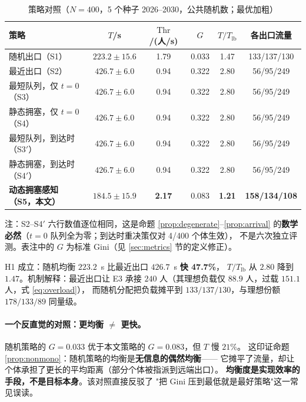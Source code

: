 \begin{table}[H]
  \centering
  \caption{策略对照（$N=400$，5 个种子 2026--2030，公共随机数；最优加粗）}
  \label{tab:main}
  \begin{tabular}{lccccc}
    \toprule
    策略 & $T$/s & $\mathrm{Thr}$/(人/s) & $G$ & $T/T_{\mathrm{lb}}$ & 各出口流量 \\
    \midrule
    随机出口（S1） & $223.2\pm15.6$ & 1.79 & 0.033 & 1.47 & 133/137/130 \\
    最近出口（S2） & $426.7\pm6.0$ & 0.94 & 0.322 & 2.80 & 56/95/249 \\
    最短队列，仅 $t=0$（S3） & $426.7\pm6.0$ & 0.94 & 0.322 & 2.80 & 56/95/249 \\
    静态拥塞，仅 $t=0$（S4） & $426.7\pm6.0$ & 0.94 & 0.322 & 2.80 & 56/95/249 \\
    最短队列，到达时（S3$'$） & $426.7\pm6.0$ & 0.94 & 0.322 & 2.80 & 56/95/249 \\
    静态拥塞，到达时（S4$'$） & $426.7\pm6.0$ & 0.94 & 0.322 & 2.80 & 56/95/249 \\
    \textbf{动态拥塞感知（S5，本文）} & $\mathbf{184.5\pm15.9}$ & \textbf{2.17} & 0.083 & \textbf{1.21} & \textbf{158/134/108} \\
    \bottomrule
  \end{tabular}
  \begin{flushleft}
  \footnotesize 注：S2--S4$'$ 六行数值逐位相同，这是命题 \ref{prop:degenerate}--\ref{prop:arrival}
  的\textbf{数学必然}（$t=0$ 队列全为零；到达时重决策仅对 4/400 个体生效），
  不是六次独立评测。表注中的 $G$ 为标准 Gini（见 \ref{sec:metrics} 节的定义修正）。
  \end{flushleft}
\end{table}

\begin{csftake}[实验一的结论]
H1 成立：随机均衡 $223.2$~s 比最近出口 $426.7$~s \textbf{快 47.7\%}，
$T/T_{\mathrm{lb}}$ 从 $2.80$ 降到 $1.47$。机制解释：最近出口让 E3 承接
$240$ 人（其理想负载仅 $88.9$ 人，过载 $151.1$ 人，式 \eqref{eq:overload}），
而随机分配把负载摊平到 $133/137/130$，与理想份额 $178/133/89$ 同量级。
\end{csftake}

\paragraph{一个反直觉的对照：更均衡 $\ne$ 更快。}
随机策略的 $G=0.033$ 优于本文策略的 $G=0.083$，但 $T$ 慢 $21\%$。
这印证命题 \ref{prop:nonmono}：随机策略的均衡是\textbf{无信息的偶然均衡}——
它摊平了流量，却让个体承担了更长的平均距离（部分个体被指派到远端出口）。
\textbf{均衡度是实现效率的手段，不是目标本身}。该对照直接反驳了
"把 Gini 压到最低就是最好策略"这一常见误读。

